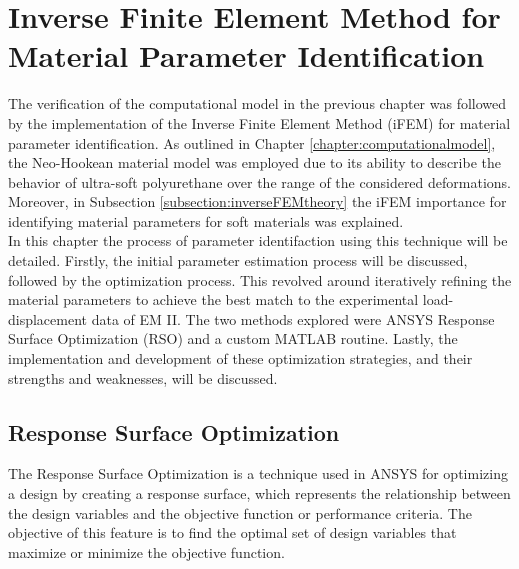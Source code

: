 
\chapter{Inverse Finite Element Method for Material Parameter Identification} %
\label{iFEMthesis} %

The verification of the computational model in the previous chapter was followed by the implementation
of the Inverse Finite Element Method (iFEM) for material parameter identification.
As outlined in Chapter \ref{chapter:computationalmodel}, the Neo-Hookean material model
was employed due to its ability to describe the behavior of ultra-soft polyurethane over 
the range of the considered deformations. Moreover, in Subsection \ref{subsection:inverseFEMtheory} 
the iFEM importance for identifying material parameters for soft materials was explained.\\

In this chapter the process of parameter identifaction 
using this technique will be detailed. Firstly, the initial parameter estimation process will be discussed, 
followed by the optimization process. This revolved around iteratively refining the material parameters
to achieve the best match to the experimental load-displacement data of EM II. The two methods 
explored were ANSYS Response Surface Optimization (RSO) and a custom MATLAB routine. Lastly, the implementation 
and development of these optimization strategies, and their strengths and weaknesses, 
will be discussed. 

\section{Response Surface Optimization}
The Response Surface Optimization is a technique used in ANSYS for optimizing a design by creating 
a response surface, which represents the relationship between the design variables and the objective 
function or performance criteria. The objective of this feature is to find the optimal set of design 
variables that maximize or minimize the objective function.


